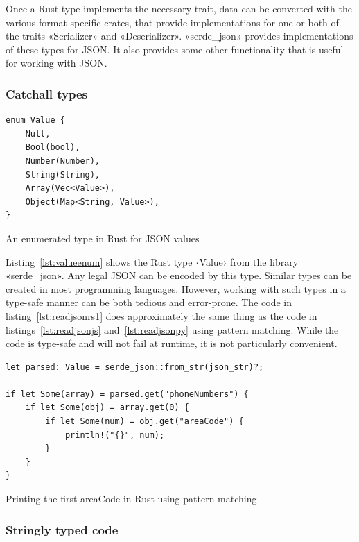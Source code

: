 Once a Rust type implements the necessary trait, data can be converted with the various format specific crates, that provide implementations for one or both of the traits «Serializer» and «Deserializer». «serde_json» provides implementations of these types for JSON. It also provides some other functionality that is useful for working with JSON.

\subsubsection{Catchall types}

\begin{listing}[ht!]
\begin{verbatim}
enum Value {
    Null,
    Bool(bool),
    Number(Number),
    String(String),
    Array(Vec<Value>),
    Object(Map<String, Value>),
}
\end{verbatim}
\caption{An enumerated type in Rust for JSON values}
\label{lst:valueenum}
\end{listing}

Listing~\ref{lst:valueenum} shows the Rust type ‹Value› from the library «serde_json». Any legal JSON can be encoded by this type. Similar types can be created in most programming languages. However, working with such types in a type-safe manner can be both tedious and error-prone. The code in listing~\ref{lst:readjsonrs1} does approximately the same thing as the code in listings~\ref{lst:readjsonjs} and~\ref{lst:readjsonpy} using pattern matching. While the code is type-safe and will not fail at runtime, it is not particularly convenient.

\begin{listing}[ht!]
\begin{verbatim}
let parsed: Value = serde_json::from_str(json_str)?;

if let Some(array) = parsed.get("phoneNumbers") {
    if let Some(obj) = array.get(0) {
        if let Some(num) = obj.get("areaCode") {
            println!("{}", num);
        }
    }
}
\end{verbatim}
\caption{Printing the first areaCode in Rust using pattern matching}
\label{lst:readjsonrs1}
\end{listing}


\subsubsection{Stringly typed code}

